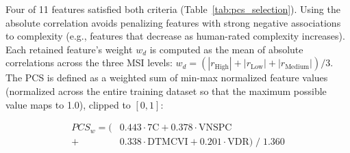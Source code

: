 \documentclass[conference]{IEEEtran}
\begin{document}
Four of 11 features satisfied both criteria (Table~\ref{tab:pcs_selection}). Using the absolute correlation avoids penalizing features with strong negative associations to complexity (e.g., features that decrease as human-rated complexity increases). Each retained feature's weight $w_d$ is computed as the mean of absolute correlations across the three MSI levels: $w_d = (|r_{\text{High}}| + |r_{\text{Low}}| + |r_{\text{Medium}}|) / 3$. The PCS is defined as a weighted sum of min-max normalized feature values (normalized across the entire training dataset so that the maximum possible value maps to 1.0), clipped to $[0, 1]$:

\begin{equation}
\begin{split}
PCS_w = \bigl(&0.443 \cdot \text{7C} + 0.378 \cdot \text{VNSPC} \\
              + &0.338 \cdot \text{DTMCVI} + 0.201 \cdot \text{VDR}\bigr) \;/\; 1.360
\end{split}
\label{eq:pcs_weighted}
\end{equation}

\begin{table}[h]
\centering
\caption{Correlation ($r$) and $p$-values of jSymbolic features with perceived complexity. Bold = $p < 0.05$. $\checkmark$ = retained.}
\label{tab:pcs_selection}
\end{table}
\end{document}
